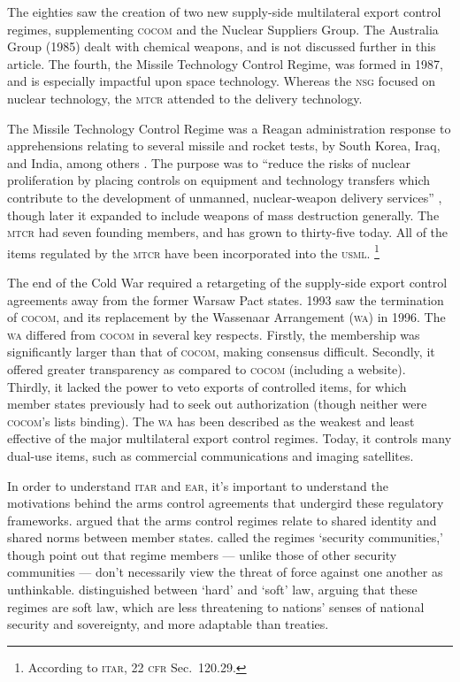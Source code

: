 \documentclass[12pt]{olfmemo}
\begin{document}
The eighties saw the creation of two new supply-side multilateral export control regimes, supplementing \textsc{cocom} and the Nuclear Suppliers Group. The Australia Group (1985) dealt with chemical weapons, and is not discussed further in this article. The fourth, the Missile Technology Control Regime, was formed in 1987, and is especially impactful upon space technology. Whereas the \textsc{nsg} focused on nuclear technology, the \textsc{mtcr} attended to the delivery technology.

The Missile Technology Control Regime was a Reagan administration response to apprehensions relating to several missile and rocket tests, by South Korea, Iraq, and India, among others \citep{Scheffran1992}. The purpose was to ``reduce the risks of nuclear proliferation by placing controls on equipment and technology transfers which contribute to the development of unmanned, nuclear-weapon delivery services'' \citep{Fialka1987}, though later it expanded to include weapons of mass destruction generally. The \textsc{mtcr} had seven founding members, and has grown to thirty-five today. All of the items regulated by the \textsc{mtcr} have been incorporated into the \textsc{usml}. \footnote{According to \textsc{itar}, 22 \textsc{cfr} Sec.~120.29.}

The end of the Cold War required a retargeting of the supply-side export control agreements away from the former Warsaw Pact states. 1993 saw the termination of \textsc{cocom}, and its replacement by the Wassenaar Arrangement (\textsc{wa}) in 1996. The \textsc{wa} differed from \textsc{cocom} in several key respects. Firstly, the membership was significantly larger than that of \textsc{cocom}, making consensus difficult. Secondly, it offered greater transparency as compared to \textsc{cocom} (including a website). Thirdly, it lacked the power to veto exports of controlled items, for which member states previously had to seek out authorization (though neither were \textsc{cocom}'s lists binding). The \textsc{wa} has been described as the weakest and least effective of the major multilateral export control regimes. Today, it controls many dual-use items, such as commercial communications and imaging satellites.

In order to understand \textsc{itar} and \textsc{ear}, it's important to understand the motivations behind the arms control agreements that undergird these regulatory frameworks. \citet{Lipson1999} argued that the arms control regimes relate to shared identity and shared norms between member states. \citet{Joyner2004} called the regimes `security communities,' though \citet{Beck2019} point out that regime members --- unlike those of other security communities --- don't necessarily view the threat of force against one another as unthinkable. \citet{Abbott2000} distinguished between `hard' and `soft' law, arguing that these regimes are soft law, which are less threatening to nations' senses of national security and sovereignty, and more adaptable than treaties.
\end{document}
